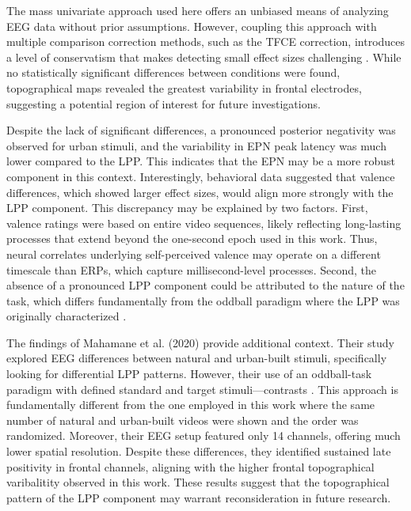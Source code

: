 The mass univariate approach used here offers an unbiased means of analyzing EEG data without prior assumptions. However, coupling this approach with multiple comparison correction methods, such as the TFCE correction, introduces a level of conservatism that makes detecting small effect sizes challenging \cite{luckHowGetStatistically2017}. While no statistically significant differences between conditions were found, topographical maps revealed the greatest variability in frontal electrodes, suggesting a potential region of interest for future investigations.

Despite the lack of significant differences, a pronounced posterior negativity was observed for urban stimuli, and the variability in EPN peak latency was much lower compared to the LPP. This indicates that the EPN may be a more robust component in this context. Interestingly, behavioral data suggested that valence differences, which showed larger effect sizes, would align more strongly with the LPP component. This discrepancy may be explained by two factors. First, valence ratings were based on entire video sequences, likely reflecting long-lasting processes that extend beyond the one-second epoch used in this work. Thus, neural correlates underlying self-perceived valence may operate on a different timescale than ERPs, which capture millisecond-level processes. Second, the absence of a pronounced LPP component could be attributed to the nature of the task, which differs fundamentally from the oddball paradigm where the LPP was originally characterized \cite{hajcakEventRelatedPotentialsEmotion2010}.

The findings of Mahamane et al. (2020) provide additional context. Their study explored EEG differences between natural and urban-built stimuli, specifically looking for differential LPP patterns. However, their use of an oddball-task paradigm with defined standard and target stimuli—contrasts \cite{mahamaneNaturalCategorizationElectrophysiological2020}. This approach is fundamentally different from the one employed in this work where the same number of natural and urban-built videos were shown and the order was randomized. Moreover, their EEG setup featured only 14 channels, offering much lower spatial resolution. Despite these differences, they identified sustained late positivity in frontal channels, aligning with the higher frontal topographical varibalitity observed in this work. These results suggest that the topographical pattern of the LPP component may warrant reconsideration in future research.

